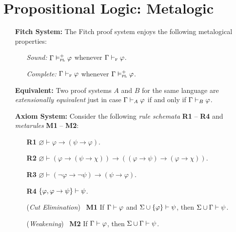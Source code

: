 \documentclass[a4paper, 11pt]{article} %
\begin{document}
\section*{\sc Propositional Logic: Metalogic}

\begin{enumerate}[leftmargin=1.2in,labelsep=.15in] 
  \item[\bf Fitch System:] The Fitch proof system enjoys the following metalogical properties:
    \begin{itemize}
      \item[\it Sound:] $\Gamma \vDash_{\textsc{pl}}^{+} \varphi$ whenever $\Gamma \vdash_{\textsc{f}} \varphi$.
      \item[\it Complete:] $\Gamma \vdash_{\textsc{f}} \varphi$ whenever $\Gamma \vDash_{\textsc{pl}}^{+} \varphi$.
    \end{itemize}
  \item[\bf Equivalent:] Two proof systems $A$ and $B$ for the same language are \textit{extensionally equivalent} just in case $\Gamma \vdash_A \varphi$ if and only if $\Gamma \vdash_B \varphi$.  
  \item[\bf Axiom System:] Consider the following \textit{rule schemata} \textbf{R1} -- \textbf{R4} and \textit{metarules} \textbf{M1} -- \textbf{M2}:
    \begin{itemize}[leftmargin=.5in]
      \item[\bf R1] $\varnothing \vdash \varphi \rightarrow (\psi \rightarrow \varphi)$.
      \item[\bf R2] $\varnothing \vdash (\varphi \rightarrow (\psi \rightarrow \chi)) \rightarrow ((\varphi \rightarrow \psi) \rightarrow (\varphi \rightarrow \chi))$.
      \item[\bf R3] $\varnothing \vdash (\neg\varphi \rightarrow \neg\psi) \rightarrow (\psi \rightarrow \varphi)$.
      \item[\bf R4] $\lbrace\varphi, \varphi \rightarrow \psi\rbrace \vdash \psi$.
      \item[({\it Cut Elimination})~ {\bf M1}] If $\Gamma \vdash \varphi$ and $\Sigma\cup\lbrace\varphi\rbrace \vdash \psi$, then $\Sigma\cup\Gamma \vdash \psi$. 
      \item[({\it Weakening})~ {\bf M2}] If $\Gamma \vdash \varphi$, then $\Sigma\cup\Gamma \vdash \psi$.
    \end{itemize}

\end{enumerate}
\end{document}
